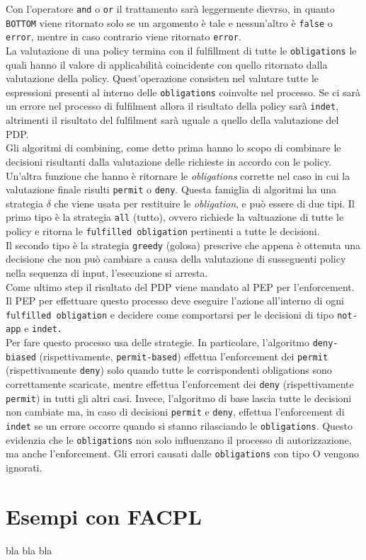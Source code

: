 Con l'operatore \texttt{and} o \texttt{or} il trattamento sarà leggermente dievrso, in quanto \texttt{BOTTOM} viene ritornato solo se un argomento è tale e nessun'altro è \texttt{false} o \texttt{error}, mentre in caso contrario viene ritornato \texttt{error}.\\
La valutazione di una policy termina con il fulfillment di tutte le \texttt{obligations} le quali hanno il valore di applicabilità coincidente con quello ritornato dalla valutazione della policy. Quest'operazione consisten nel valutare tutte le espressioni presenti al interno delle \texttt{obligations} coinvolte nel processo. Se ci sarà un errore nel processo di fulfilment allora il risultato della policy sarà \texttt{indet}, altrimenti il risultato del fulfilment sarà uguale a quello della valutazione del PDP.\\
Gli algoritmi di combining, come detto prima hanno lo scopo di combinare le decisioni risultanti dalla valutazione delle richieste in accordo con le policy. Un'altra funzione che hanno è ritornare le \textit{obligations} corrette nel caso in cui la valutazione finale risulti \texttt{permit} o \texttt{deny}. Questa famiglia di algoritmi ha una strategia $\delta$ che viene usata per restituire le \textit{obligation}, e può essere di due tipi.
Il primo tipo è la strategia \texttt{all} (tutto), ovvero richiede la valtuazione di tutte le policy e ritorna le \texttt{fulfilled obligation} pertinenti a tutte le decisioni.\\
Il secondo tipo è la strategia \texttt{greedy} (golosa) prescrive che appena è ottenuta una decisione che non può cambiare a causa della valutazione di susseguenti policy nella sequenza di input, l'esecuzione si arresta.\\
Come ultimo step il risultato del PDP viene mandato al PEP per l'enforcement.
Il PEP per effettuare questo processo deve eseguire l'azione all'interno di ogni \texttt{fulfilled obligation} e decidere come comportarsi per le decisioni di tipo \texttt{not-app} e \texttt{indet.}\\
Per fare questo processo usa delle strategie. In particolare, l'algoritmo \texttt{deny-biased} (rispettivamente, \texttt{permit-based}) effettua l'enforcement dei \texttt{permit} (rispettivamente \texttt{deny}) solo quando tutte le corrispondenti obligations sono correttamente scaricate, mentre effettua l'enforcement dei \texttt{deny} (rispettivamente \texttt{permit}) in tutti gli altri casi. Invece, l'algoritmo di base lascia tutte le decisioni non cambiate ma, in caso di decisioni \texttt{permit} e \texttt{deny}, effettua l'enforcement di \texttt{indet} se un errore occorre quando si stanno rilasciando le \texttt{obligations}. Questo evidenzia che le \texttt{obligations} non solo influenzano il processo di autorizzazione, ma anche l'enforcement. Gli errori causati dalle \texttt{obligations} con tipo O vengono ignorati.

\section{Esempi con FACPL}
\label{sec:esempi_facpl}
bla bla bla 
